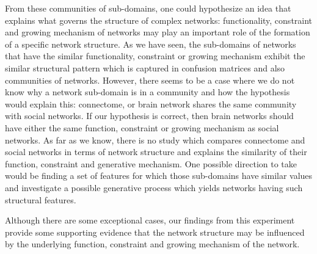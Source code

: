 From these communities of sub-domains, one could hypothesize an idea that explains what governs the structure of complex networks: functionality, constraint and growing mechanism of networks may play an important role of the formation of a specific network structure. As we have seen, the sub-domains of networks that have the similar functionality, constraint or growing mechanism exhibit the similar structural pattern which is captured in confusion matrices and also communities of networks. However, there seems to be a case where we do not know why a network sub-domain is in a community and how the hypothesis would explain this: connectome, or brain network shares the same community with social networks. If our hypothesis is correct, then brain networks should have either the same function, constraint or growing mechanism as social networks. As far as we know, there is no study which compares connectome and social networks in terms of network structure and explains the similarity of their function, constraint and generative mechanism. One possible direction to take would be finding a set of features for which those sub-domains have similar values and investigate a possible generative process which yields networks having such structural features.

Although there are some exceptional cases, our findings from this experiment provide some supporting evidence that the network structure may be influenced by the underlying function, constraint and growing mechanism of the network.


